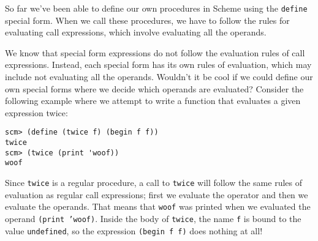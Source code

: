 %
%

So far we've been able to define our own procedures in Scheme using the
\texttt{define} special form. When we call these procedures, we have to follow
the rules for evaluating call expressions, which involve evaluating all the
operands.

We know that special form expressions do not follow the evaluation rules of
call expressions. Instead, each special form has its own rules of evaluation,
which may include not evaluating all the operands.  Wouldn't it be cool if we
could define our own special forms where we decide which operands are
evaluated?  Consider the following example where we attempt to write a function
that evaluates a given expression twice:

\begin{lstlisting}
scm> (define (twice f) (begin f f))
twice
scm> (twice (print 'woof))
woof
\end{lstlisting}

Since \texttt{twice} is a regular procedure, a call to \texttt{twice} will
follow the same rules of evaluation as regular call expressions; first we
evaluate the operator and then we evaluate the operands.  That means that
\texttt{woof} was printed when we evaluated the operand \texttt{(print 'woof)}.
Inside the body of \texttt{twice}, the name \texttt{f} is bound to the value
\texttt{undefined}, so the expression \texttt{(begin f f)} does nothing at all!

